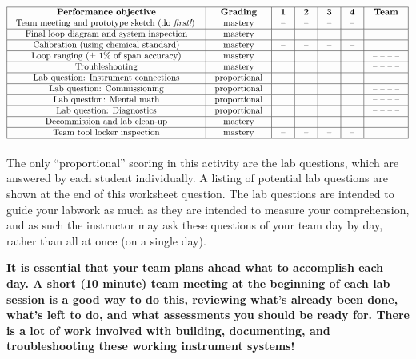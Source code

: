 \documentclass[12pt,a4paper]{article}
\begin{document}


$$\vbox{\offinterlineskip
\halign{\strut
\vrule \quad\hfil # \ \hfil & 
\vrule \quad\hfil # \ \hfil & 
\vrule \quad\hfil # \ \hfil & 
\vrule \quad\hfil # \ \hfil & 
\vrule \quad\hfil # \ \hfil & 
\vrule \quad\hfil # \ \hfil & 
\vrule \quad\hfil # \ \hfil \vrule \cr
\noalign{\hrule}
%
{\bf Performance objective} & {\bf Grading} & {\bf 1} & {\bf 2} & {\bf 3} & {\bf 4} & {\bf Team} \cr
%
\noalign{\hrule}
%
Team meeting and prototype sketch (do {\it first!}) & mastery & -- & -- & -- & -- & \cr
%
\noalign{\hrule}
%
Final loop diagram and system inspection & mastery & & & & & -- -- -- -- \cr
%
\noalign{\hrule}
%
Calibration (using chemical standard) & mastery & -- & -- & -- & -- &  \cr
%
\noalign{\hrule}
%
Loop ranging ($\pm$ 1\% of span accuracy) & mastery & & & & & -- -- -- -- \cr
%
\noalign{\hrule}
%
Troubleshooting & mastery & & & & & -- -- -- -- \cr
%
\noalign{\hrule}
%
Lab question: Instrument connections & proportional &  &  &  &  & -- -- -- -- \cr
%
\noalign{\hrule}
%
Lab question: Commissioning & proportional &  &  &  &  & -- -- -- -- \cr
%
\noalign{\hrule}
%
Lab question: Mental math & proportional &  &  &  &  & -- -- -- -- \cr
%
\noalign{\hrule}
%
Lab question: Diagnostics & proportional &  &  &  &  & -- -- -- -- \cr
%
\noalign{\hrule}
%
Decommission and lab clean-up & mastery & -- & -- & -- & -- &  \cr
%
\noalign{\hrule}
%
Team tool locker inspection & mastery & -- & -- & -- & -- &  \cr
%
\noalign{\hrule}
} %
}$$ %

The only ``proportional'' scoring in this activity are the lab questions, which are answered by each student individually.  A listing of potential lab questions are shown at the end of this worksheet question.  The lab questions are intended to guide your labwork as much as they are intended to measure your comprehension, and as such the instructor may ask these questions of your team day by day, rather than all at once (on a single day).

\vskip 10pt

{\bf It is essential that your team plans ahead what to accomplish each day.  A short (10 minute) team meeting at the beginning of each lab session is a good way to do this, reviewing what's already been done, what's left to do, and what assessments you should be ready for.  There is a lot of work involved with building, documenting, and troubleshooting these working instrument systems!}
\end{document}
